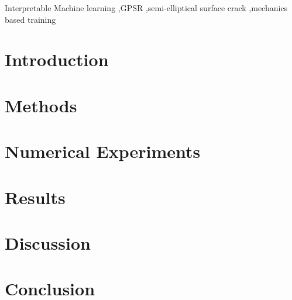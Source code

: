 \documentclass[preprint,12pt]{elsarticle}
\author{}
\date{}
\begin{document}
 
\begin{frontmatter}

	\begin{abstract}
		
		
	\end{abstract}
	\begin{keyword}
		Interpretable Machine learning \sep GPSR \sep semi-elliptical surface crack \sep mechanics based training	
	\end{keyword}
	
\end{frontmatter}

\section{Introduction}

\section{Methods}

\section{Numerical Experiments}

\section{Results}

\section{Discussion}

\section{Conclusion}





\newpage

%
\end{document}
